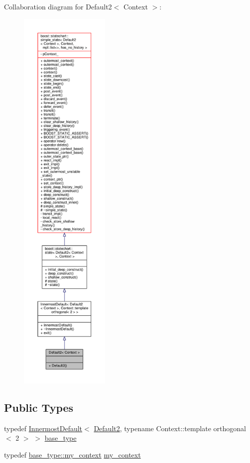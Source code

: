 Collaboration diagram for Default2$<$ Context $>$\+:
\nopagebreak
\begin{figure}[H]
\begin{center}
\leavevmode
\includegraphics[height=550pt]{struct_default2__coll__graph}
\end{center}
\end{figure}
\subsection*{Public Types}
\begin{DoxyCompactItemize}
\item 
typedef \mbox{\hyperlink{struct_innermost_default}{Innermost\+Default}}$<$ \mbox{\hyperlink{struct_default2}{Default2}}, typename Context\+::template orthogonal$<$ 2 $>$ $>$ \mbox{\hyperlink{struct_default2_aae469ef4a6b1376464a07533dcf665c7}{base\+\_\+type}}
\item 
typedef \mbox{\hyperlink{struct_innermost_default_a0aab337364dec3101e80f293b709d53d}{base\+\_\+type\+::my\+\_\+context}} \mbox{\hyperlink{struct_default2_aa57309f1d125010ae36dd0793bc35535}{my\+\_\+context}}
\end{DoxyCompactItemize}
